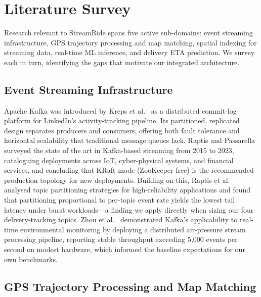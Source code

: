 \documentclass[conference]{IEEEtran}
\begin{document}
\section{Literature Survey}
\label{sec:related}

Research relevant to StreamRide spans five active sub-domains:
event streaming infrastructure, GPS trajectory processing and map
matching, spatial indexing for streaming data, real-time ML inference,
and delivery ETA prediction. We survey each in turn, identifying the
gaps that motivate our integrated architecture.

\subsection{Event Streaming Infrastructure}

Apache Kafka was introduced by Kreps et al.~\cite{kreps2011kafka}
as a distributed commit-log platform for LinkedIn's activity-tracking
pipeline. Its partitioned, replicated design separates producers and
consumers, offering both fault tolerance and horizontal scalability
that traditional message queues lack. Raptis and
Passarella~\cite{raptis2023survey} surveyed the state of the art in
Kafka-based streaming from 2015 to 2023, cataloguing deployments
across IoT, cyber-physical systems, and financial services, and
concluding that KRaft mode (ZooKeeper-free) is the recommended
production topology for new deployments. Building on this, Raptis
et al.~\cite{raptis2024partition} analysed topic partitioning
strategies for high-reliability applications and found that
partitioning proportional to per-topic event rate yields the lowest
tail latency under burst workloads—a finding we apply directly
when sizing our four delivery-tracking topics. Zhou et
al.~\cite{zhou2024kafka} demonstrated Kafka's applicability to
real-time environmental monitoring by deploying a distributed air-pressure
stream processing pipeline, reporting stable throughput exceeding
5,000 events per second on modest hardware, which informed the
baseline expectations for our own benchmarks.

\subsection{GPS Trajectory Processing and Map Matching}
\end{document}
